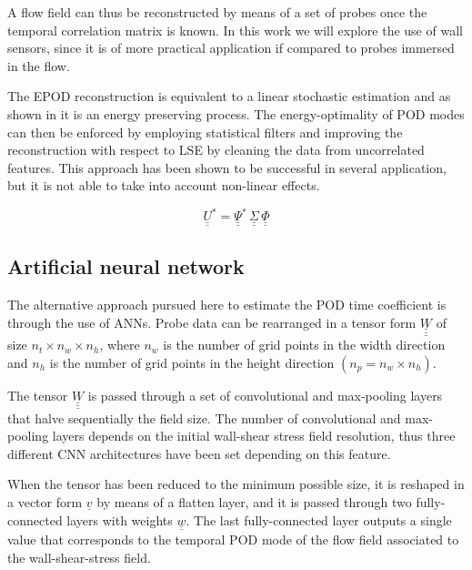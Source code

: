 A flow field can thus be reconstructed by means of a set of probes once the temporal correlation matrix is known.
In this work we will explore the use of wall sensors, since it is of more practical application if compared to probes immersed in the flow.

The EPOD reconstruction is equivalent to a linear stochastic estimation and as shown in \citet{discetti2018estimation} it is an energy preserving process.
The energy-optimality of POD modes can then be enforced by employing statistical filters \citep{discetti2018estimation} and improving the reconstruction with respect to LSE by cleaning the data from uncorrelated features.
This approach has been shown to be successful in several application, but it is not able to take into account non-linear effects.

\begin{equation}
   \underline{\underline{U}}^* = \underline{\underline{\Psi}}^*\,\underline{\underline{\Sigma}}\,\underline{\underline{\Phi}}
   \label{ur}
\end{equation}

\subsection{\label{sec:22}Artificial neural network}

The alternative approach pursued here to estimate the POD time coefficient is through the use of ANNs.
Probe data can be rearranged in a tensor form $\underline{\underline{\underline{W}}}$ of size $n_t\times n_w \times n_h$, where $n_w$ is the number of grid points in the width direction and $n_h$ is the number of grid points in the height direction $(n_p=n_w\times n_h)$.

The tensor $\underline{\underline{\underline{W}}}$ is passed through a set of convolutional and max-pooling layers that halve sequentially the field size.
The number of convolutional and max-pooling layers depends on the initial wall-shear stress field resolution, thus three different CNN architectures have been set depending on this feature.

When the tensor has been reduced to the minimum possible size, it is reshaped in a vector form $\underline{v}$ by means of a flatten layer, and it is passed through two fully-connected layers with weights $\underline{\underline{w}}$.
The last fully-connected layer outputs a single value that corresponds to the temporal POD mode of the flow field associated to the wall-shear-stress field.

